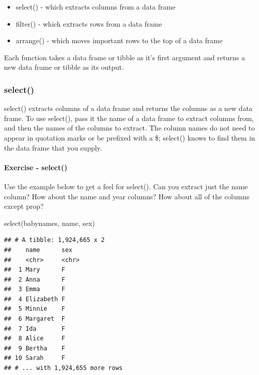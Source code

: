 \documentclass[
]{article}
\newenvironment{Shaded}{\begin{snugshade}}{\end{snugshade}}
\newcommand{\FunctionTok}[1]{\textcolor[rgb]{0.00,0.00,0.00}{#1}}
\newcommand{\NormalTok}[1]{#1}
\providecommand{\tightlist}{%
  \setlength{\itemsep}{0pt}\setlength{\parskip}{0pt}}
\begin{document}
\begin{itemize}
\tightlist
\item
  select() - which extracts columns from a data frame
\item
  filter() - which extracts rows from a data frame
\item
  arrange() - which moves important rows to the top of a data frame
\end{itemize}

Each function takes a data frame or tibble as it's first argument and
returns a new data frame or tibble as its output.

\hypertarget{select}{%
\subsubsection{select()}\label{select}}

select() extracts columns of a data frame and returns the columns as a
new data frame. To use select(), pass it the name of a data frame to
extract columns from, and then the names of the columns to extract. The
column names do not need to appear in quotation marks or be prefixed
with a \$; select() knows to find them in the data frame that you
supply.

\hypertarget{exercise---select}{%
\paragraph{Exercise - select()}\label{exercise---select}}

Use the example below to get a feel for select(). Can you extract just
the name column? How about the name and year columns? How about all of
the columns except prop?

\begin{Shaded}
\begin{Highlighting}[]
\FunctionTok{select}\NormalTok{(babynames, name, sex)}
\end{Highlighting}
\end{Shaded}

\begin{verbatim}
## # A tibble: 1,924,665 x 2
##    name      sex  
##    <chr>     <chr>
##  1 Mary      F    
##  2 Anna      F    
##  3 Emma      F    
##  4 Elizabeth F    
##  5 Minnie    F    
##  6 Margaret  F    
##  7 Ida       F    
##  8 Alice     F    
##  9 Bertha    F    
## 10 Sarah     F    
## # ... with 1,924,655 more rows
\end{verbatim}
\end{document}
